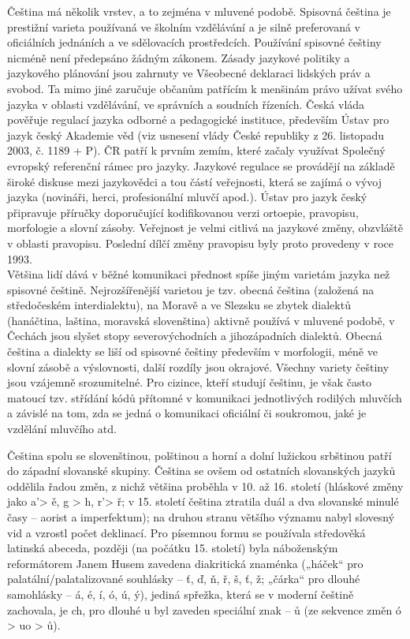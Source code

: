 \documentclass[]{../../metanetpaper}
\begin{document}
\begin{multicols}{2}
Čeština má několik vrstev, a to zejména v mluvené podobě. Spisovná čeština je prestižní varieta používaná ve školním vzdělávání a je silně preferovaná v oficiálních jednáních a ve sdělovacích prostředcích. Používání spisovné češtiny nicméně není předepsáno žádným zákonem. Zásady jazykové politiky a jazykového plánování jsou zahrnuty ve Všeobecné deklaraci lidských práv a svobod. Ta mimo jiné zaručuje občanům patřícím k menšinám právo užívat svého jazyka v oblasti vzdělávání, ve správních a soudních řízeních. Česká vláda pověřuje regulací jazyka odborné a pedagogické instituce, především Ústav pro jazyk český Akademie věd (viz usnesení vlády České republiky z 26. listopadu 2003, č. 1189 + P). ČR patří k prvním zemím, které začaly využívat Společný evropský referenční rámec pro jazyky. Jazykové regulace se provádějí na základě široké diskuse mezi jazykovědci a tou částí veřejnosti, která se zajímá o vývoj jazyka (novináři, herci, profesionální mluvčí apod.). Ústav pro jazyk český připravuje příručky doporučující kodifikovanou verzi ortoepie, pravopisu, morfologie a slovní zásoby. Veřejnost je velmi citlivá na jazykové změny, obzvláště v oblasti pravopisu. Poslední dílčí změny pravopisu byly proto provedeny v roce 1993.\\
Většina lidí dává v běžné komunikaci přednost spíše jiným varietám jazyka než spisovné češtině. Nejrozšířenější varietou je tzv. obecná čeština (založená na středočeském interdialektu), na Moravě a ve Slezsku se zbytek dialektů (hanáčtina, laština, moravská slovenština) aktivně používá v mluvené podobě, v Čechách jsou slyšet stopy severovýchodních a jihozápadních dialektů.\cite{Note3} Obecná čeština a dialekty se liší od spisovné češtiny především v morfologii, méně ve slovní zásobě a výslovnosti, další rozdíly jsou okrajové. Všechny variety češtiny jsou vzájemně srozumitelné. Pro cizince, kteří studují češtinu, je však často matoucí tzv. střídání kódů přítomné v komunikaci jednotlivých rodilých mluvčích a závislé na tom, zda se jedná o komunikaci oficiální či soukromou, jaké je vzdělání mluvčího atd.

Čeština spolu se slovenštinou, polštinou a horní a dolní lužickou srbštinou patří do západní slovanské skupiny. Čeština se ovšem od ostatních slovanských jazyků oddělila řadou změn, z nichž většina proběhla v 10. až 16. století (hláskové změny jako a’> ě, g > h, r’> ř; v 15. století čeština ztratila duál a dva slovanské minulé časy – aorist a imperfektum); na druhou stranu většího významu nabyl slovesný vid a vzrostl počet deklinací. Pro písemnou formu se používala středověká latinská abeceda, později (na počátku 15. století) byla náboženským reformátorem Janem Husem zavedena diakritická znaménka („háček“ pro palatální/palatalizované souhlásky – ť, ď, ň, ř, š, ť, ž; „čárka“ pro dlouhé samohlásky – á, é, í, ó, ú, ý), jediná spřežka, která se v moderní češtině zachovala, je ch, pro dlouhé u byl zaveden speciální znak – ů (ze sekvence změn ó > uo > ů).


\end{multicols}
\end{document}
